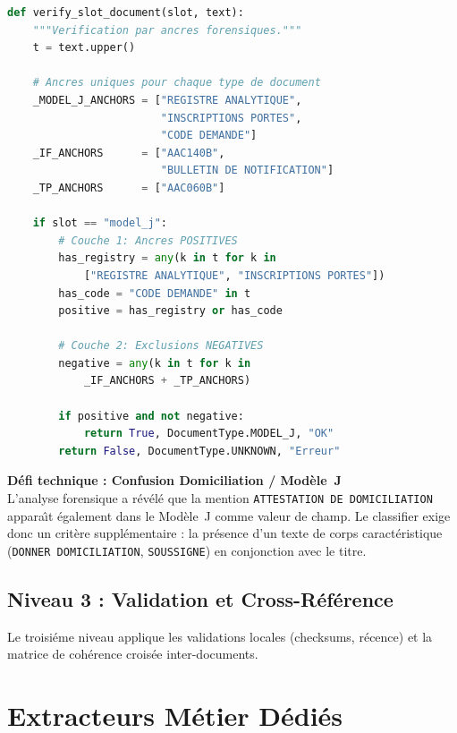 \begin{lstlisting}[language=Python, caption={Classifier \`{a} deux couches --- Exemple pour le Mod\`{e}le J (classifier.py).}, label={lst:classifier}]
def verify_slot_document(slot, text):
    """Verification par ancres forensiques."""
    t = text.upper()
    
    # Ancres uniques pour chaque type de document
    _MODEL_J_ANCHORS = ["REGISTRE ANALYTIQUE",
                        "INSCRIPTIONS PORTES",
                        "CODE DEMANDE"]
    _IF_ANCHORS      = ["AAC140B",
                        "BULLETIN DE NOTIFICATION"]
    _TP_ANCHORS      = ["AAC060B"]
    
    if slot == "model_j":
        # Couche 1: Ancres POSITIVES
        has_registry = any(k in t for k in
            ["REGISTRE ANALYTIQUE", "INSCRIPTIONS PORTES"])
        has_code = "CODE DEMANDE" in t
        positive = has_registry or has_code
        
        # Couche 2: Exclusions NEGATIVES
        negative = any(k in t for k in
            _IF_ANCHORS + _TP_ANCHORS)
        
        if positive and not negative:
            return True, DocumentType.MODEL_J, "OK"
        return False, DocumentType.UNKNOWN, "Erreur"
\end{lstlisting}

\begin{riskbox}
\textbf{D\'{e}fi technique : Confusion Domiciliation / Mod\`{e}le~J} \\
L'analyse forensique a r\'{e}v\'{e}l\'{e} que la mention \texttt{ATTESTATION DE DOMICILIATION} appara\^{\i}t \'{e}galement dans le Mod\`{e}le~J comme valeur de champ. Le classifier exige donc un crit\`{e}re suppl\'{e}mentaire : la pr\'{e}sence d'un texte de corps caract\'{e}ristique (\texttt{DONNER DOMICILIATION}, \texttt{SOUSSIGNE}) en conjonction avec le titre.
\end{riskbox}

\subsection{Niveau 3 : Validation et Cross-R\'{e}f\'{e}rence}

Le troisi\'{e}me niveau applique les validations locales (checksums, r\'{e}cence) et la matrice de coh\'{e}rence crois\'{e}e inter-documents.

\section{Extracteurs M\'{e}tier D\'{e}di\'{e}s}


